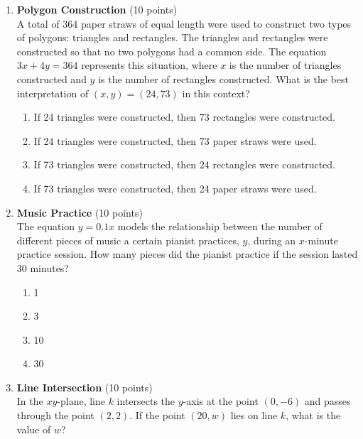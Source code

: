 \begin{enumerate}
  \item \textbf{Polygon Construction} (10 points)\\
  A total of 364 paper straws of equal length were used to construct two types of polygons: triangles and rectangles. The triangles and rectangles were constructed so that no two polygons had a common side. The equation $3x+4y=364$ represents this situation, where $x$ is the number of triangles constructed and $y$ is the number of rectangles constructed. What is the best interpretation of $(x,y)=(24,73)$ in this context?\\
  \begin{enumerate}[label=(\Alph*)]
    \item If 24 triangles were constructed, then 73 rectangles were constructed.
    \item If 24 triangles were constructed, then 73 paper straws were used.
    \item If 73 triangles were constructed, then 24 rectangles were constructed.
    \item If 73 triangles were constructed, then 24 paper straws were used.
  \end{enumerate}
  \begin{subanswer}
  \end{subanswer}

  \newpage

  \item \textbf{Music Practice} (10 points)\\
  The equation $y=0.1x$ models the relationship between the number of different pieces of music a certain pianist practices, $y$, during an $x$-minute practice session. How many pieces did the pianist practice if the session lasted 30 minutes?\\
  \begin{enumerate}[label=(\Alph*)]
    \item 1
    \item 3
    \item 10
    \item 30
  \end{enumerate}
  \begin{subanswer}
  \end{subanswer}

  \item \textbf{Line Intersection} (10 points)\\
  In the $xy$-plane, line $k$ intersects the $y$-axis at the point $(0,-6)$ and passes through the point $(2,2)$. If the point $(20,w)$ lies on line $k$, what is the value of $w$?
  \begin{subanswer}
  \end{subanswer}


\end{enumerate}
